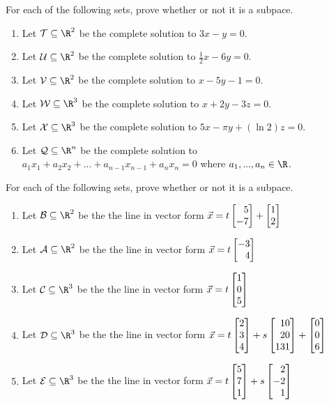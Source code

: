 \begin{exercises}
	\begin{problist}

		\prob For each of the following sets, prove whether or not it is a subpace.
		\begin{enumerate}
			\item Let $\mathcal T \subseteq \R^2$ be the complete solution to $3x-y=0$.
			\item Let $\mathcal U \subseteq \R^2$ be the complete solution to $\frac{1}{2}x-6y=0$.
			\item Let $\mathcal V \subseteq \R^2$ be the complete solution to $x-5y-1=0$.
			\item Let $\mathcal W \subseteq \R^3$ be the complete solution to $x+2y-3z=0$.
			\item Let $\mathcal X \subseteq \R^3$ be the complete solution to
			$5x-\pi y + (\ln 2)z=0$.
			\item Let $\mathcal Q \subseteq \R^n$ be the complete solution to
			$a_1x_1+a_2x_2+...+a_{n-1}x_{n-1}+a_nx_n=0$ where $a_1,...,a_n \in \R$.
		\end{enumerate}

		\prob For each of the following sets, prove whether or not it is a subpace.
		\begin{enumerate}
			\item Let $\mathcal B \subseteq \R^2$ be the the line in vector form
			$\vec x = t\mat{5\\-7}+\mat{1\\2}$
			\item Let $\mathcal A \subseteq \R^2$ be the the line in vector form
			$\vec x = t\mat{-3\\4}$
			\item Let $\mathcal C \subseteq \R^3$ be the the line in vector form
			$\vec x = t\mat{1\\0\\5}$
			\item Let $\mathcal D \subseteq \R^3$ be the the line in vector form
			$\vec x = t\mat{2\\3\\4}+s\mat{10\\20\\131}+\mat{0\\0\\6}$
			\item Let $\mathcal E \subseteq \R^3$ be the the line in vector form
			$\vec x = t\mat{5\\7\\1}+s\mat{2\\-2\\1}$
		\end{enumerate}


\end{problist}
\end{exercises}
